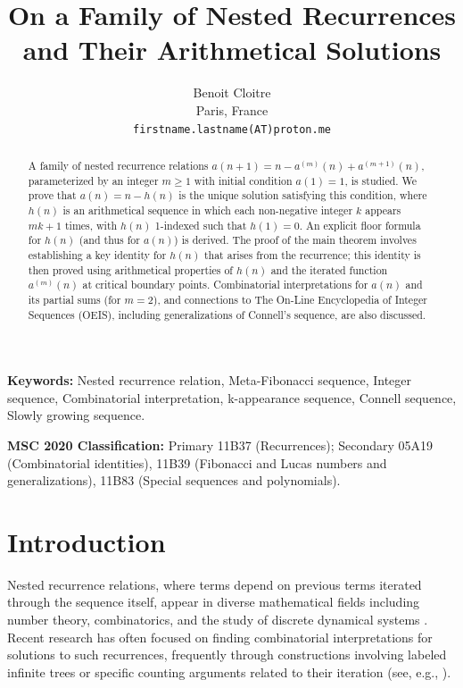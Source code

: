 \documentclass[11pt,a4paper]{article} %
\title{On a Family of Nested Recurrences and Their Arithmetical Solutions}
\author{Benoit Cloitre \\ \small Paris, France \\ \small \texttt{firstname.lastname(AT)proton.me}} %
\date{} %
\theoremstyle{remark}
\begin{document}
\maketitle

\begin{abstract}
A family of nested recurrence relations $a(n+1) = n - a^{(m)}(n) + a^{(m+1)}(n)$, parameterized by an integer $m \ge 1$ with initial condition $a(1)=1$, is studied. We prove that $a(n)=n-h(n)$ is the unique solution satisfying this condition, where $h(n)$ is an arithmetical sequence in which each non-negative integer $k$ appears $mk+1$ times, with $h(n)$ 1-indexed such that $h(1)=0$. An explicit floor formula for $h(n)$ (and thus for $a(n)$) is derived. The proof of the main theorem involves establishing a key identity for $h(n)$ that arises from the recurrence; this identity is then proved using arithmetical properties of $h(n)$ and the iterated function $a^{(m)}(n)$ at critical boundary points. Combinatorial interpretations for $a(n)$ and its partial sums (for $m=2$), and connections to The On-Line Encyclopedia of Integer Sequences (OEIS), including generalizations of Connell's sequence, are also discussed.
\end{abstract}

\noindent\textbf{Keywords:} Nested recurrence relation, Meta-Fibonacci sequence, Integer sequence, Combinatorial interpretation, k-appearance sequence, Connell sequence, Slowly growing sequence.

\noindent\textbf{MSC 2020 Classification:} Primary 11B37 (Recurrences); Secondary 05A19 (Combinatorial identities), 11B39 (Fibonacci and Lucas numbers and generalizations), 11B83 (Special sequences and polynomials).

\section{Introduction} \label{sec:intro}

Nested recurrence relations, where terms depend on previous terms iterated through the sequence itself, appear in diverse mathematical fields including number theory, combinatorics, and the study of discrete dynamical systems \cite{Guy2004, Hofstadter1979}. Recent research has often focused on finding combinatorial interpretations for solutions to such recurrences, frequently through constructions involving labeled infinite trees or specific counting arguments related to their iteration (see, e.g., \cite{Deugau2009Ruskey, Fox2022}).
\end{document}
